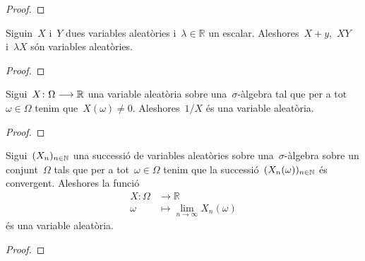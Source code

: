 \documentclass[../probabilitat.tex]{subfiles}
\begin{document}
    \begin{proof}
    \end{proof}
    \begin{proposition}
        \label{prop:les-variables-aleatories-formen-un-anell}
        Siguin~\(X\) i~\(Y\) dues variables aleatòries i~\(\lambda\in\mathbb{R}\) un escalar.
        Aleshores~\(X+y\),~\(XY\) i~\(\lambda X\) són variables aleatòries.
    \end{proposition}
    \begin{proof}
    \end{proof}
    \begin{proposition}
        \label{prop:les-variables-aleatories-formen-un-cos}
        Sigui~\(X\colon\Omega\longrightarrow\mathbb{R}\) una variable aleatòria sobre una~\(\sigma\)-àlgebra tal que per a tot~\(\omega\in\Omega\) tenim que~\(X(\omega)\neq0\).
        Aleshores~\(1/X\) és una variable aleatòria.
    \end{proposition}
    \begin{proof}
    \end{proof}
    \begin{proposition}
        \label{prop:el-cos-de-variables-aleatories-es-tancat}
        Sigui~\((X_{n})_{n\in\mathbb{N}}\) una successió de variables aleatòries sobre una~\(\sigma\)-àlgebra sobre un conjunt~\(\Omega\) tals que per a tot~\(\omega\in\Omega\) tenim que la successió~\((X_{n}(\omega))_{n\in\mathbb{N}}\) és convergent.
        Aleshores la funció
        \begin{align*}
            X\colon\Omega&\longrightarrow\mathbb{R} \\
            \omega&\longmapsto\lim_{n\to\infty}X_{n}(\omega)
        \end{align*}
        és una variable aleatòria.
    \end{proposition}
    \begin{proof}
    \end{proof}
\end{document}
